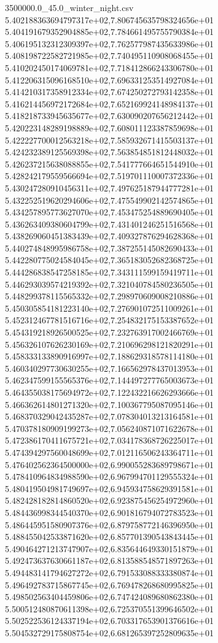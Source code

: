\begin{filecontents*}{3500000.0_45.0_winter_night.csv}
5.402188363694797317e+02,7.806745635798324656e+01
5.404191679352904885e+02,7.784661495755790384e+01
5.406195132312309397e+02,7.762577987435633986e+01
5.408198722582721985e+02,7.740495110908068455e+01
5.410202450174069781e+02,7.718412866243306780e+01
5.412206315096168510e+02,7.696331253514927084e+01
5.414210317358912334e+02,7.674250272793142358e+01
5.416214456972172684e+02,7.652169924148984137e+01
5.418218733945635677e+02,7.630090207656212442e+01
5.420223148289198889e+02,7.608011123387859698e+01
5.422227700012563218e+02,7.585932671415503137e+01
5.424232389125569398e+02,7.563854851812448032e+01
5.426237215638088855e+02,7.541777664651544910e+01
5.428242179559566694e+02,7.519701110007372336e+01
5.430247280910456311e+02,7.497625187944777281e+01
5.432252519620294606e+02,7.475549902142574865e+01
5.434257895773627070e+02,7.453475254889690405e+01
5.436263409380604799e+02,7.431401246251516568e+01
5.438269060451383439e+02,7.409327876294628368e+01
5.440274848995986758e+02,7.387255145082690433e+01
5.442280775024584045e+02,7.365183052682368725e+01
5.444286838547258185e+02,7.343111599159419711e+01
5.446293039574219392e+02,7.321040784580236505e+01
5.448299378115565332e+02,7.298970609008210886e+01
5.450305854181223140e+02,7.276901072511009261e+01
5.452312467781516716e+02,7.254832175153387652e+01
5.454319218926500525e+02,7.232763917002466769e+01
5.456326107626230169e+02,7.210696298121820291e+01
5.458333133890916997e+02,7.188629318578114180e+01
5.460340297730630255e+02,7.166562978437013953e+01
5.462347599155565376e+02,7.144497277765003673e+01
5.464355038175694972e+02,7.122432216626293666e+01
5.466362614801271320e+02,7.100367795087095146e+01
5.468370329042435287e+02,7.078304013213164581e+01
5.470378180909199273e+02,7.056240871071622678e+01
5.472386170411675721e+02,7.034178368726225017e+01
5.474394297560048699e+02,7.012116506243364711e+01
5.476402562364500000e+02,6.990055283689798671e+01
5.478410964834988590e+02,6.967994701129555324e+01
5.480419504981749697e+02,6.945934758629391581e+01
5.482428182814860520e+02,6.923875456254972960e+01
5.484436998344540370e+02,6.901816794072783523e+01
5.486445951580907376e+02,6.879758772146396950e+01
5.488455042533871620e+02,6.857701390543843445e+01
5.490464271213747907e+02,6.835644649330151879e+01
5.492473637630661187e+02,6.813588548571897263e+01
5.494483141794627272e+02,6.791533088333380874e+01
5.496492783715867745e+02,6.769478268680995825e+01
5.498502563404459806e+02,6.747424089680862380e+01
5.500512480870611398e+02,6.725370551399646502e+01
5.502522536124337194e+02,6.703317653901376616e+01
5.504532729175808754e+02,6.681265397252809635e+01

\end{filecontents*}
